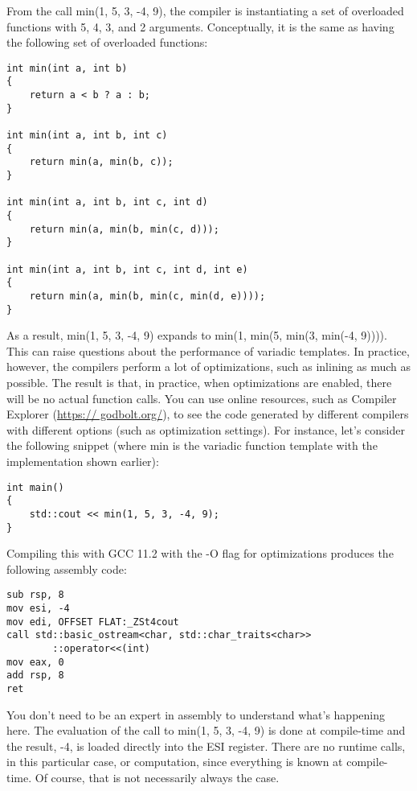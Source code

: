 From the call min(1, 5, 3, -4, 9), the compiler is instantiating a set of overloaded functions with 5, 4, 3, and 2 arguments. Conceptually, it is the same as having the following set of overloaded functions:

\begin{lstlisting}[style=styleCXX]
int min(int a, int b)
{
	return a < b ? a : b;
}

int min(int a, int b, int c)
{
	return min(a, min(b, c));
}

int min(int a, int b, int c, int d)
{
	return min(a, min(b, min(c, d)));
}

int min(int a, int b, int c, int d, int e)
{
	return min(a, min(b, min(c, min(d, e))));
}
\end{lstlisting}

As a result, min(1, 5, 3, -4, 9) expands to min(1, min(5, min(3, min(-4, 9)))). This can raise questions about the performance of variadic templates. In practice, however, the compilers perform a lot of optimizations, such as inlining as much as possible. The result is that, in practice, when optimizations are enabled, there will be no actual function calls. You can use online resources, such as Compiler Explorer (\url{https:// godbolt.org/}), to see the code generated by different compilers with different options (such as optimization settings). For instance, let's consider the following snippet (where min is the variadic function template with the implementation shown earlier):

\begin{lstlisting}[style=styleCXX]
int main()
{
	std::cout << min(1, 5, 3, -4, 9);
}
\end{lstlisting}

Compiling this with GCC 11.2 with the -O flag for optimizations produces the following assembly code:

\begin{lstlisting}[style=styleCXX]
sub rsp, 8
mov esi, -4
mov edi, OFFSET FLAT:_ZSt4cout
call std::basic_ostream<char, std::char_traits<char>>
        ::operator<<(int)
mov eax, 0
add rsp, 8
ret
\end{lstlisting}

You don't need to be an expert in assembly to understand what's happening here. The evaluation of the call to min(1, 5, 3, -4, 9) is done at compile-time and the result, -4, is loaded directly into the ESI register. There are no runtime calls, in this particular case, or computation, since everything is known at compile-time. Of course, that is not necessarily always the case.

